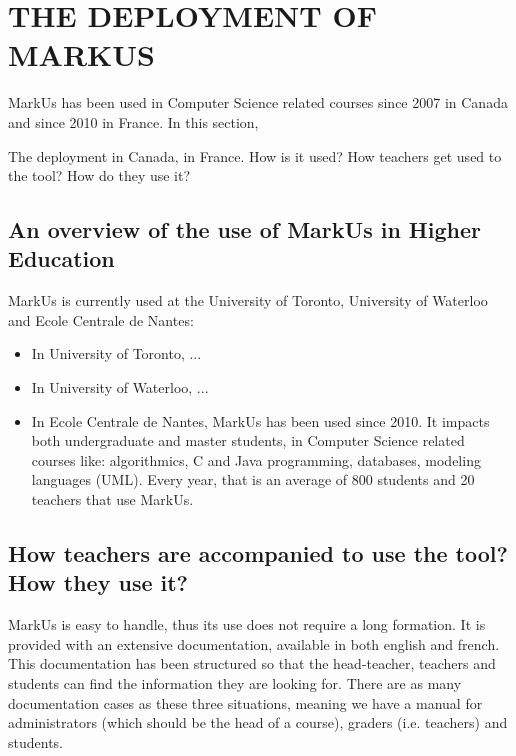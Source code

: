 \documentclass[twocolumn,10pt]{asme2e}
\begin{document}

\section*{THE DEPLOYMENT OF MARKUS}

MarkUs has been used in Computer Science related courses since 2007 in Canada and since 2010 in France. In this section, 

The deployment in Canada, in France. How is it used? How teachers get used to the tool? How do they use it?

\subsection*{An overview of the use of MarkUs in Higher Education}

MarkUs is currently used at the University of Toronto, University of Waterloo and Ecole Centrale de Nantes: 
\begin{itemize}
\item In University of Toronto, ... %
\item In University of Waterloo, ... %
\item In Ecole Centrale de Nantes, MarkUs has been used since 2010. It impacts both undergraduate and master students, in Computer Science related courses like: algorithmics, C and Java programming, databases, modeling languages (UML). Every year, that is an average of 800 students and 20 teachers that use MarkUs. %
\end{itemize}

\subsection*{How teachers are accompanied to use the tool? How they use it?}

MarkUs is easy to handle, thus its use does not require a long formation. It
is provided with an extensive documentation, available in both english and
french. This documentation has been structured so that the head-teacher,
teachers and students can find the information they are looking for. There are
as many documentation cases as these three situations, meaning we have a
manual for administrators (which should be the head of a course), graders
(i.e. teachers) and students. 
\end{document}
